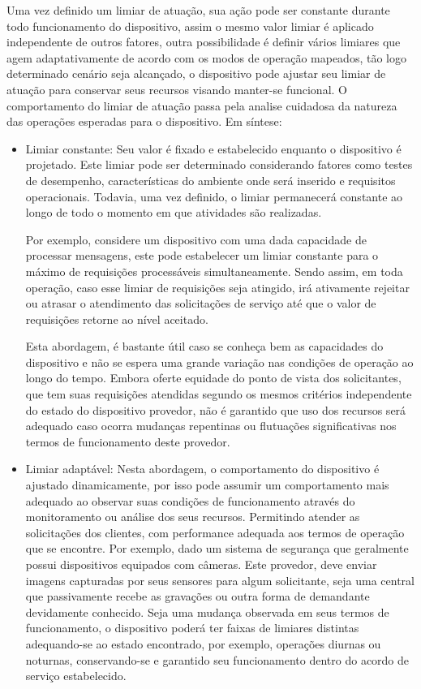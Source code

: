 Uma vez definido um limiar de atuação, sua ação pode ser constante durante todo funcionamento do dispositivo, assim o mesmo valor limiar é aplicado independente de outros fatores, outra possibilidade é definir vários limiares que agem adaptativamente de acordo com os modos de operação mapeados, tão logo determinado cenário seja alcançado, o dispositivo pode ajustar seu limiar de atuação para conservar seus recursos visando manter-se funcional. O comportamento do limiar de atuação passa pela analise cuidadosa da natureza das operações esperadas para o dispositivo. Em síntese:

\begin{itemize}
    \item Limiar constante: Seu valor é fixado e estabelecido enquanto o dispositivo é projetado. Este limiar pode ser determinado considerando fatores como testes de desempenho, características do ambiente onde será inserido e requisitos operacionais. Todavia, uma vez definido, o limiar permanecerá constante ao longo de todo o momento em que  atividades são realizadas.
    
    Por exemplo, considere um dispositivo com uma dada capacidade de processar mensagens, este pode estabelecer um limiar constante para o máximo de requisições processáveis simultaneamente. Sendo assim, em toda operação, caso esse limiar de requisições seja atingido, irá ativamente rejeitar ou atrasar o atendimento das solicitações de serviço até que o valor de requisições retorne ao nível aceitado. 
    
    Esta abordagem, é bastante útil caso se conheça bem as capacidades do dispositivo e não se espera uma grande variação nas condições de operação ao longo do tempo. Embora oferte equidade do ponto de vista dos solicitantes, que tem suas requisições atendidas segundo os mesmos critérios independente do estado do dispositivo provedor, não é garantido que uso dos recursos será adequado caso ocorra mudanças repentinas ou flutuações significativas nos termos de funcionamento deste provedor.
    
    \item Limiar adaptável: Nesta abordagem, o comportamento do dispositivo é ajustado dinamicamente, por isso pode assumir um comportamento mais adequado ao observar suas condições de funcionamento através do monitoramento ou análise dos seus recursos. Permitindo atender as solicitações dos clientes, com performance adequada aos termos de operação que se encontre. Por exemplo, dado um sistema de segurança que geralmente possui dispositivos equipados com câmeras. Este provedor, deve enviar imagens capturadas por seus sensores para algum solicitante, seja uma central que passivamente recebe as gravações ou outra forma de demandante devidamente conhecido. Seja uma mudança observada em seus termos de funcionamento, o dispositivo poderá ter faixas de limiares distintas adequando-se ao estado encontrado, por exemplo, operações diurnas ou noturnas, conservando-se e garantido seu funcionamento dentro do acordo de serviço estabelecido.   
    

\end{itemize}
